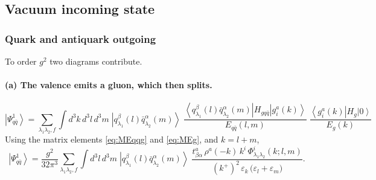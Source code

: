 \documentclass[11pt]{article}
\newcommand{\eps}{\varepsilon}
\newcommand{\ket}[1]{\left|#1\right\rangle}
\newcommand{\bra}[1]{\left\langle#1\right|}
\newcommand{\vac}{\ket{0}}
\newcommand{\Ph}{\Phi}
\newcommand{\qk}[3]{q^{#1}_{#2}(#3)}
\newcommand{\aqk}[3]{\bar q^{#1}_{#2}(#3)}
\newcommand{\gl}[3]{g^{#1}_{#2}(#3)}
\begin{document}
\subsection{Vacuum incoming state}
\subsubsection{Quark and antiquark outgoing}

To order $g^{2}$ two diagrams contribute.

\paragraph{(a) The valence emits a gluon, which then splits.}
\begin{center}
\end{center}
\begin{equation}
\ket{\Psi^{1}_{q\bar q}}=\sum_{\lambda_{1}\lambda_{2},f}\int\! d^{3}k\,d^{3}l\,d^{3}m\;
\ket{\qk{\beta}{\lambda_{1}}{l}\aqk{\alpha}{\lambda_{2}}{m}}\;
\frac{\bra{\qk{\beta}{\lambda_{1}}{l}\aqk{\alpha}{\lambda_{2}}{m}}H_{gq\bar q}\ket{\gl{a}{i}{k}}}
{E_{q\bar q}(l,m)}\;
\frac{\bra{\gl{a}{i}{k}}H_{g}\vac}{E_{g}(k)}
\end{equation}
Using the matrix elements \eqref{eq:MEqqg} and \eqref{eq:MEg}, and $k=l+m$,
\begin{equation}
\ket{\Psi^{1}_{q\bar q}}=\frac{g^{2}}{32\pi^{3}}\sum_{\lambda_{1}\lambda_{2},f}\int\!d^{3}l\,d^{3}m\;
\ket{\qk{\beta}{\lambda_{1}}{l}\aqk{\alpha}{\lambda_{2}}{m}}\;
\frac{t^{a}_{\beta\alpha}\,\rho^{a}(-k)\,k^{i}\,\Ph^{i}_{\lambda_{1}\lambda_{2}}(k;l,m)}
{(k^{+})^{2}\,\eps_{k}\,\big(\eps_{l}+\eps_{m}\big)} .
\label{eq:P1}
\end{equation}
\end{document}
